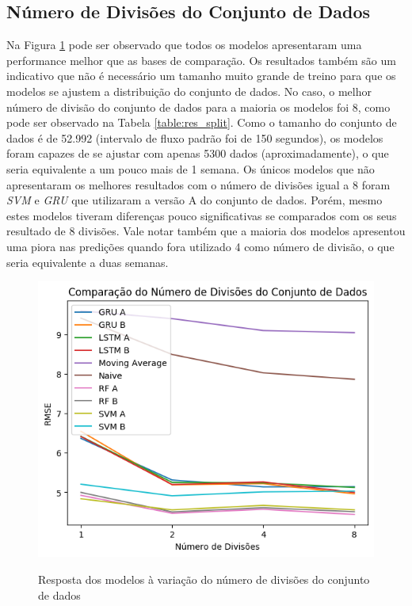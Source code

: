\subsection{Número de Divisões do Conjunto de Dados}

Na Figura \ref{figure:res_split} pode ser observado que todos os modelos apresentaram uma performance melhor que as bases de comparação. Os resultados também são um indicativo que não é necessário um tamanho muito grande de treino para que os modelos se ajustem a distribuição do conjunto de dados. No caso, o melhor número de divisão do conjunto de dados para a maioria os modelos foi  8, como pode ser observado na Tabela \ref{table:res_split}. Como o tamanho do conjunto de dados é de 52.992 (intervalo de fluxo padrão foi de 150 segundos), os modelos foram capazes de se ajustar com apenas 5300 dados (aproximadamente), o que seria equivalente a um pouco mais de 1 semana. Os únicos modelos que não apresentaram os melhores resultados com o número de divisões igual a 8 foram \textit{\acrshort{SVM}} e \textit{\acrshort{GRU}} que utilizaram a versão A do conjunto de dados. Porém, mesmo estes modelos tiveram diferenças pouco significativas se comparados com os seus resultado de 8 divisões. Vale notar também que a maioria dos modelos apresentou uma piora nas predições quando fora utilizado 4 como número de divisão, o que seria equivalente a duas semanas.

\begin{figure}[htbp]
    \centering
    \includegraphics[scale=0.8]{monography/img/comparisons/comparacao_do_numero_de_divisoes_do_conjunto_de_dados_rmse.png}
    \label{figure:res_split}
    \caption[Resposta dos modelos à variação do número de divisões do conjunto de dados]{Resposta dos modelos à variação do número de divisões do conjunto de dados}
\end{figure} 

